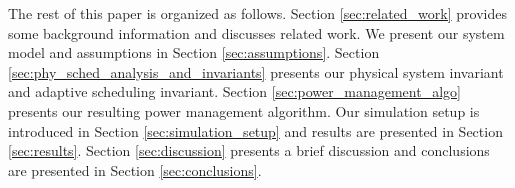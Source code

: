 The rest of this paper is organized as follows. Section \ref{sec:related_work}
provides some background information and discusses related work. We present our
system model and assumptions in Section \ref{sec:assumptions}. Section
\ref{sec:phy_sched_analysis_and_invariants} presents our physical system 
invariant and adaptive scheduling invariant. Section \ref{sec:power_management_algo} 
presents our resulting power management algorithm. Our simulation setup is introduced 
in Section \ref{sec:simulation_setup} and results are presented in Section
\ref{sec:results}. Section \ref{sec:discussion} presents a brief discussion and
conclusions are presented in Section \ref{sec:conclusions}.

